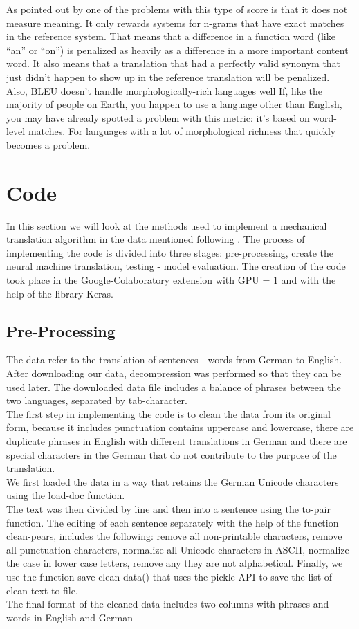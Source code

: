 ﻿\documentclass[conference]{IEEEtran}
\begin{document}
As pointed out by \cite{risk} one of the problems with this type of score is that it does not measure meaning. It only rewards systems for n-grams that have exact matches in the reference system. That means that a difference in a function word (like “an” or “on”) is penalized as heavily as a difference in a more important content word. It also means that a translation that had a perfectly valid synonym that just didn’t happen to show up in the reference translation will be penalized.\\
Also, BLEU doesn’t handle morphologically-rich languages well If, like the majority of people on Earth, you happen to use a language other than English, you may have already spotted a problem with this metric: it’s based on word-level matches. For languages with a lot of morphological richness that quickly becomes a problem.


\section{Code}
In this section we will look at the methods used to implement a mechanical translation algorithm in the data mentioned  following \cite{scratch}. The process of implementing the code is divided into three stages: pre-processing, create the neural machine translation, testing - model evaluation. The creation of the code took place in the Google-Colaboratory extension with GPU = 1 and with the help of the library Keras.


\subsection{Pre-Processing}
The data refer to the translation of sentences - words from German to English.
After downloading our data, decompression was performed so that they can be used later.
The downloaded data file includes a balance of phrases between the two languages, separated by tab-character.\\
The first step in implementing the code is to clean the data from its original form, because it includes punctuation contains uppercase and lowercase, there are duplicate phrases in English with different translations in German and there are special characters in the German that do not contribute to the purpose of the translation.\\
We first loaded the data in a way that retains the German Unicode characters using the load-doc function.\\
The text was then divided by line and then into a sentence using the to-pair function.
The editing of each sentence separately with the help of the function clean-pears, includes the following: remove all non-printable characters, remove all punctuation characters, normalize all Unicode characters in ASCII, normalize the case in lower case letters, remove any they are not alphabetical.
Finally, we use the function save-clean-data() that uses the pickle API to save the list of clean text to file.\\
The final format of the cleaned data includes two columns with phrases and words in English and German
\end{document}
